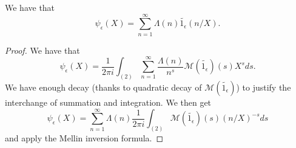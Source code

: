 \begin{theorem}[SmoothedChebyshevDirichlet]
\label{SmoothedChebyshevDirichlet}
\leanok
We have that
  $$\psi_{\epsilon}(X) = \sum_{n=1}^\infty \Lambda(n)\widetilde{1_{\epsilon}}(n/X).$$
\end{theorem}
\begin{proof}
\leanok
We have that
  $$\psi_{\epsilon}(X) = \frac{1}{2\pi i}\int_{(2)}\sum_{n=1}^\infty \frac{\Lambda(n)}{n^s}
  \mathcal{M}(\widetilde{1_{\epsilon}})(s)
  X^{s}ds.$$
  We have enough decay (thanks to quadratic decay of $\mathcal{M}(\widetilde{1_{\epsilon}})$) to
  justify the interchange of summation and integration. We then get
  $$\psi_{\epsilon}(X) =
  \sum_{n=1}^\infty \Lambda(n)\frac{1}{2\pi i}\int_{(2)}
  \mathcal{M}(\widetilde{1_{\epsilon}})(s)
  (n/X)^{-s}
  ds
  $$
  and apply the Mellin inversion formula.
\end{proof}

